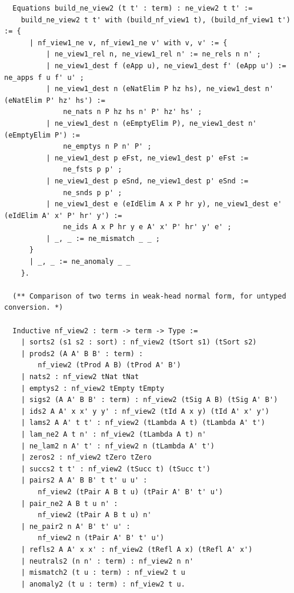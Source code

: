 \documentclass[10pt,a4paper]{amsart}
\begin{document}
\begin{lstlisting}
  Equations build_ne_view2 (t t' : term) : ne_view2 t t' :=
    build_ne_view2 t t' with (build_nf_view1 t), (build_nf_view1 t') := {
      | nf_view1_ne v, nf_view1_ne v' with v, v' := {
          | ne_view1_rel n, ne_view1_rel n' := ne_rels n n' ;
          | ne_view1_dest f (eApp u), ne_view1_dest f' (eApp u') := ne_apps f u f' u' ;
          | ne_view1_dest n (eNatElim P hz hs), ne_view1_dest n' (eNatElim P' hz' hs') :=
              ne_nats n P hz hs n' P' hz' hs' ;
          | ne_view1_dest n (eEmptyElim P), ne_view1_dest n' (eEmptyElim P') :=
              ne_emptys n P n' P' ;
          | ne_view1_dest p eFst, ne_view1_dest p' eFst :=
              ne_fsts p p' ;
          | ne_view1_dest p eSnd, ne_view1_dest p' eSnd :=
              ne_snds p p' ;
          | ne_view1_dest e (eIdElim A x P hr y), ne_view1_dest e' (eIdElim A' x' P' hr' y') :=
              ne_ids A x P hr y e A' x' P' hr' y' e' ;
          | _, _ := ne_mismatch _ _ ;
      }
      | _, _ := ne_anomaly _ _
    }.

  (** Comparison of two terms in weak-head normal form, for untyped conversion. *)

  Inductive nf_view2 : term -> term -> Type :=
    | sorts2 (s1 s2 : sort) : nf_view2 (tSort s1) (tSort s2)
    | prods2 (A A' B B' : term) :
        nf_view2 (tProd A B) (tProd A' B')
    | nats2 : nf_view2 tNat tNat
    | emptys2 : nf_view2 tEmpty tEmpty
    | sigs2 (A A' B B' : term) : nf_view2 (tSig A B) (tSig A' B')
    | ids2 A A' x x' y y' : nf_view2 (tId A x y) (tId A' x' y')
    | lams2 A A' t t' : nf_view2 (tLambda A t) (tLambda A' t')
    | lam_ne2 A t n' : nf_view2 (tLambda A t) n'
    | ne_lam2 n A' t' : nf_view2 n (tLambda A' t')
    | zeros2 : nf_view2 tZero tZero
    | succs2 t t' : nf_view2 (tSucc t) (tSucc t')
    | pairs2 A A' B B' t t' u u' :
        nf_view2 (tPair A B t u) (tPair A' B' t' u')
    | pair_ne2 A B t u n' :
        nf_view2 (tPair A B t u) n'
    | ne_pair2 n A' B' t' u' :
        nf_view2 n (tPair A' B' t' u')
    | refls2 A A' x x' : nf_view2 (tRefl A x) (tRefl A' x')
    | neutrals2 (n n' : term) : nf_view2 n n'
    | mismatch2 (t u : term) : nf_view2 t u
    | anomaly2 (t u : term) : nf_view2 t u.
    

\end{lstlisting}
\end{document}
